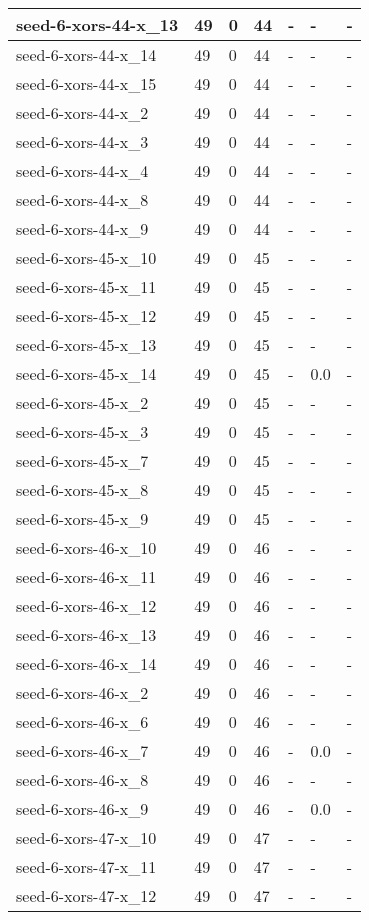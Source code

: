\begin{scriptsize}
\begin{longtable}{|p{5cm}|l|l|l|l|l|l|}
seed-6-xors-44-x\_13&49&0&44&-&-&- \\ \hline 
seed-6-xors-44-x\_14&49&0&44&-&-&- \\ \hline 
seed-6-xors-44-x\_15&49&0&44&-&-&- \\ \hline 
seed-6-xors-44-x\_2&49&0&44&-&-&- \\ \hline 
seed-6-xors-44-x\_3&49&0&44&-&-&- \\ \hline 
seed-6-xors-44-x\_4&49&0&44&-&-&- \\ \hline 
seed-6-xors-44-x\_8&49&0&44&-&-&- \\ \hline 
seed-6-xors-44-x\_9&49&0&44&-&-&- \\ \hline 
seed-6-xors-45-x\_10&49&0&45&-&-&- \\ \hline 
seed-6-xors-45-x\_11&49&0&45&-&-&- \\ \hline 
seed-6-xors-45-x\_12&49&0&45&-&-&- \\ \hline 
seed-6-xors-45-x\_13&49&0&45&-&-&- \\ \hline 
seed-6-xors-45-x\_14&49&0&45&-&0.0&- \\ \hline 
seed-6-xors-45-x\_2&49&0&45&-&-&- \\ \hline 
seed-6-xors-45-x\_3&49&0&45&-&-&- \\ \hline 
seed-6-xors-45-x\_7&49&0&45&-&-&- \\ \hline 
seed-6-xors-45-x\_8&49&0&45&-&-&- \\ \hline 
seed-6-xors-45-x\_9&49&0&45&-&-&- \\ \hline 
seed-6-xors-46-x\_10&49&0&46&-&-&- \\ \hline 
seed-6-xors-46-x\_11&49&0&46&-&-&- \\ \hline 
seed-6-xors-46-x\_12&49&0&46&-&-&- \\ \hline 
seed-6-xors-46-x\_13&49&0&46&-&-&- \\ \hline 
seed-6-xors-46-x\_14&49&0&46&-&-&- \\ \hline 
seed-6-xors-46-x\_2&49&0&46&-&-&- \\ \hline 
seed-6-xors-46-x\_6&49&0&46&-&-&- \\ \hline 
seed-6-xors-46-x\_7&49&0&46&-&0.0&- \\ \hline 
seed-6-xors-46-x\_8&49&0&46&-&-&- \\ \hline 
seed-6-xors-46-x\_9&49&0&46&-&0.0&- \\ \hline 
seed-6-xors-47-x\_10&49&0&47&-&-&- \\ \hline 
seed-6-xors-47-x\_11&49&0&47&-&-&- \\ \hline 
seed-6-xors-47-x\_12&49&0&47&-&-&- \\ \hline 

\end{longtable}
\end{scriptsize}

